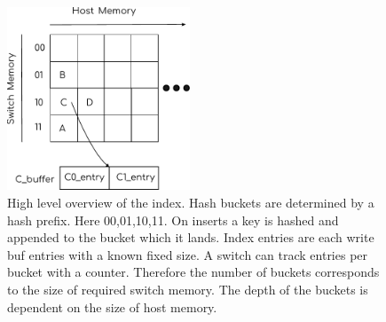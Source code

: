 \begin{figure}[t] \includegraphics[width=0.485\textwidth]{fig/Index.pdf}

\caption{High level overview of the index. Hash buckets are determined by a hash
prefix. Here 00,01,10,11. On inserts a key is hashed and appended to the bucket
which it lands. Index entries are each write buf entries with a known fixed
size. A switch can track entries per bucket with a counter. Therefore the number
of buckets corresponds to the size of required switch memory. The depth of the
buckets is dependent on the size of host memory.}

\label{fig:cas_vs_swap}
\end{figure}

